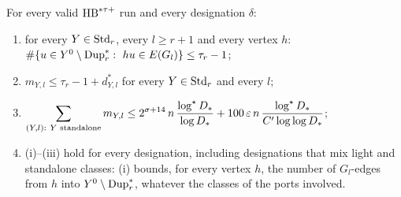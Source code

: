 \begin{theorem}\label{s6:thmCONC}
For every valid $\mathrm{HB}^{*\tau{+}}$ run and every designation $\delta$:
\begin{enumerate}
\item[(i)] for every $Y\in\mathrm{Std}_r$, every $l\ge r+1$ and every vertex $h$: $\#\{u\in Y^0\setminus\mathrm{Dup}^{*}_r:\ hu\in E(G_l)\}\le\tau_r-1$;
\item[(ii)] $m_{Y,l}\le\tau_r-1+d^*_{Y,l}$ for every $Y\in\mathrm{Std}_r$ and every $l$;
\item[(iii)] $\displaystyle\sum_{(Y,l):\ Y\text{ standalone}}m_{Y,l}\le2^{\sigma+14}\,n\,\frac{\log^{\star}D_{*}}{\log D_{*}}+100\,\varepsilon\,n\,\frac{\log^{\star}D_{*}}{C'\log\log D_{*}}$;
\item[(iv)] (i)--(iii) hold for every designation, including designations that mix light and standalone classes: (i) bounds, for every vertex $h$, the number of $G_l$-edges from $h$ into $Y^0\setminus\mathrm{Dup}^{*}_r$, whatever the classes of the ports involved.
\end{enumerate}
\deps{\ref{s2:propOrigin}, \ref{s2:lemTower}, \ref{s2:propOV}, \ref{s2:lemLacunary}, \ref{s6:defDesign}, \ref{s2:defHBtp}, \ref{s1:condG1}}
\end{theorem}

